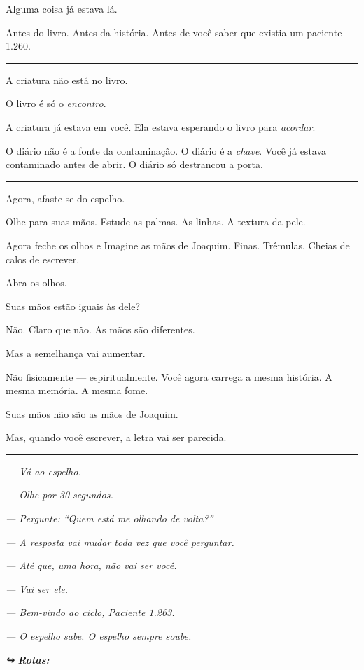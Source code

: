 \noindent Alguma coisa já estava lá.

\noindent Antes do livro.
Antes da história.
Antes de você saber que existia um paciente 1.260.

\vspace{0.5em}\noindent\rule{\textwidth}{0.5pt}\vspace{0.5em}

\noindent A criatura não está no livro.

\noindent O livro é só o \textit{encontro}.

\noindent A criatura já estava em você. Ela estava esperando o livro para \textit{acordar}.

\noindent O diário não é a fonte da contaminação.
O diário é a \textit{chave}.
Você já estava contaminado antes de abrir.
O diário só destrancou a porta.

\vspace{0.5em}\noindent\rule{\textwidth}{0.5pt}\vspace{0.5em}

\noindent Agora, afaste-se do espelho.

\noindent Olhe para suas mãos. Estude as palmas. As linhas. A textura da pele.

\noindent Agora feche os olhos e Imagine as mãos de Joaquim. Finas. Trêmulas. Cheias de calos de escrever.

\noindent Abra os olhos.

\noindent Suas mãos estão iguais às dele?

\noindent Não. Claro que não. As mãos são diferentes.

\noindent Mas a semelhança vai aumentar.

\noindent Não fisicamente --- espiritualmente. Você agora carrega a mesma história. A mesma memória. A mesma fome.

\noindent Suas mãos não são as mãos de Joaquim.

\noindent Mas, quando você escrever, a letra vai ser parecida.

\vspace{0.5em}\noindent\rule{\textwidth}{0.5pt}\vspace{0.5em}

\noindent \textit{--- Vá ao espelho.}

\noindent \textit{--- Olhe por 30 segundos.}

\noindent \textit{--- Pergunte: \textquotedblleft{}Quem está me olhando de volta?\textquotedblright{}}

\noindent \textit{--- A resposta vai mudar toda vez que você perguntar.}

\noindent \textit{--- Até que, uma hora, não vai ser você.}

\noindent \textit{--- Vai ser ele.}

\noindent \textit{--- Bem-vindo ao ciclo, Paciente 1.263.}

\noindent \textit{--- O espelho sabe. O espelho sempre soube.}

\vspace{0.5em}

\noindent\textit{\textbf{↪ Rotas:}  \rotasep {} \rotasep {}}